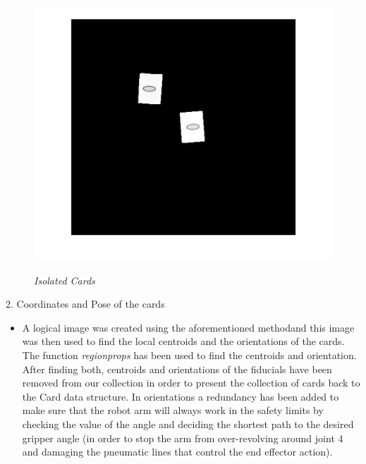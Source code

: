 \begin{figure}[position = here]
	\begin{centering}
		\includegraphics[scale=0.9]{./sachiths_images/image32.png}\\
		\caption[]{\textit{Isolated Cards}}
	\end{centering}
\end{figure}

2.	Coordinates and Pose of the cards
\begin{itemize}
	\item A logical image was created using the aforementioned methodand this image was then used to find the local centroids and the orientations of the cards. The function \emph{regionprops} has been used to find the centroids and orientation. After finding both, centroids and orientations of the fiducials have been removed from our collection in order to present the collection of cards back to the Card data structure. In orientations a redundancy has been added to make sure that the robot arm will always work in the safety limits by checking the value of the angle and deciding the shortest path to the desired gripper angle (in order to stop the arm from over-revolving around joint 4 and damaging the pneumatic lines that control the end effector action).
	
\end{itemize}

